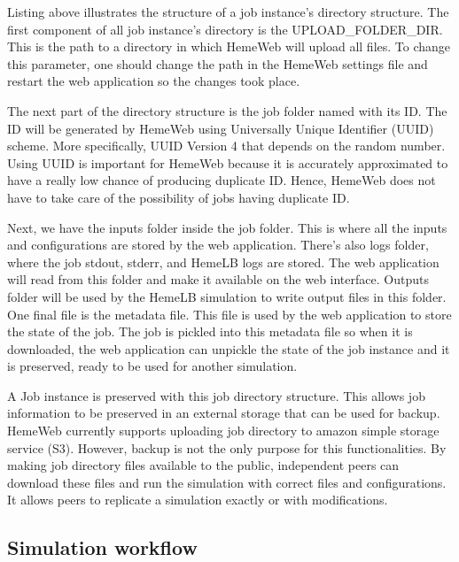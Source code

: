 Listing above illustrates the structure of a job instance's directory structure.  The first component of all job instance's directory is the UPLOAD\_FOLDER\_DIR. This is the path to a directory in which HemeWeb will upload all files. To change this parameter, one should change the path in the HemeWeb settings file and restart the web application so the changes took place.

The next part of the directory structure is the job folder named with its ID. The ID will be generated by HemeWeb using Universally Unique Identifier (UUID) scheme. More specifically, UUID Version 4 that depends on the random number. Using UUID is important for HemeWeb because it is accurately approximated to have a really low chance of producing duplicate ID. Hence, HemeWeb does not have to take care of the possibility of jobs having duplicate ID.

Next, we have the inputs folder inside the job folder. This is where all the inputs and configurations are stored by the web application. There's also logs folder, where the job stdout, stderr, and HemeLB logs are stored. The web application will read from this folder and make it available on the web interface. Outputs folder will be used by the HemeLB simulation to write output files in this folder. One final file is the metadata file. This file is used by the web application to store the state of the job. The job is pickled into this metadata file so when it is downloaded, the web application can unpickle the state of the job instance and it is preserved, ready to be used for another simulation.

A Job instance is preserved with this job directory structure. This allows job information to be preserved in an external storage that can be used for backup. HemeWeb currently supports uploading job directory to amazon simple storage service (S3). However, backup is not the only purpose for this functionalities. By making job directory files available to the public, independent peers can download these files and run the simulation with correct files and configurations. It allows peers to replicate a simulation exactly or with modifications.

\subsection{Simulation workflow}

\vspace{1cm}

